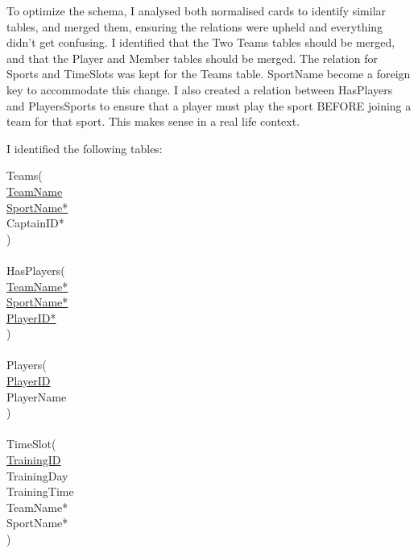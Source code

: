 \documentclass[11pt, article]{article}
\begin{document}
To optimize the schema, I analysed both normalised cards to identify similar tables, and merged them, ensuring the relations were upheld and everything didn't get confusing. I identified that the Two Teams tables should be merged, and that the Player and Member tables should be merged. The relation for Sports and TimeSlots was kept for the Teams table. SportName become a foreign key to accommodate this change. I also created a relation between HasPlayers and PlayersSports to ensure that a player must play the sport BEFORE joining a team for that sport. This makes sense in a real life context.

I identified the following tables:

\begin{tabbing}
Teams( \newline \\
	\hspace{5mm}  \underline{TeamName}\\
	\hspace{5mm} \underline{SportName*} \\
	\hspace{5mm} CaptainID*                     \\
)\\
\\
HasPlayers(\\
	\hspace{5mm}  \underline{TeamName*}\\
	\hspace{5mm} \underline{SportName*} \\
	\hspace{5mm}  \underline{PlayerID*}\\
)\\
\\
	
Players( \newline \\
	\hspace{5mm}  \underline{PlayerID}\\
	\hspace{5mm} PlayerName                      \\
)\\
\\
TimeSlot( \newline \\
	\hspace{5mm}  \underline{TrainingID}\\
	\hspace{5mm} TrainingDay                     \\
	\hspace{5mm} TrainingTime \\
	\hspace{5mm}  TeamName*\\
	\hspace{5mm} SportName* \\
)\\


\end{tabbing}
\end{document}
